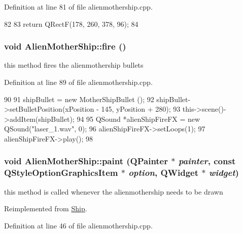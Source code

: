 Definition at line 81 of file alienmothership.cpp.


\begin{DoxyCode}
82 {
83     return QRectF(178, 260, 378, 96);
84 }
\end{DoxyCode}
\hypertarget{class_alien_mother_ship_ae95a8f7d76ccb8ed76f6ce1851c76b5a}{
\subsubsection[{fire}]{\setlength{\rightskip}{0pt plus 5cm}void AlienMotherShip::fire ()}}
\label{class_alien_mother_ship_ae95a8f7d76ccb8ed76f6ce1851c76b5a}
this method fires the alienmothership bullets 

Definition at line 89 of file alienmothership.cpp.


\begin{DoxyCode}
90 {
91     shipBullet = new MotherShipBullet ();
92     shipBullet->setBulletPosition(xPosition - 145, yPosition + 280);
93     this->scene()->addItem(shipBullet);
94 
95     QSound *alienShipFireFX = new QSound("laser_1.wav", 0);
96     alienShipFireFX->setLoops(1);
97     alienShipFireFX->play();
98 }
\end{DoxyCode}
\hypertarget{class_alien_mother_ship_a9d504befceb130b6c833550f6f6a0b53}{
\subsubsection[{paint}]{\setlength{\rightskip}{0pt plus 5cm}void AlienMotherShip::paint (QPainter $\ast$ {\em painter}, \/  const QStyleOptionGraphicsItem $\ast$ {\em option}, \/  QWidget $\ast$ {\em widget})}}
\label{class_alien_mother_ship_a9d504befceb130b6c833550f6f6a0b53}
this method is called whenever the alienmothership needs to be drawn 

Reimplemented from \hyperlink{class_ship_a1dad980a3b84bb77c63da853ec13477d}{Ship}.

Definition at line 46 of file alienmothership.cpp.


